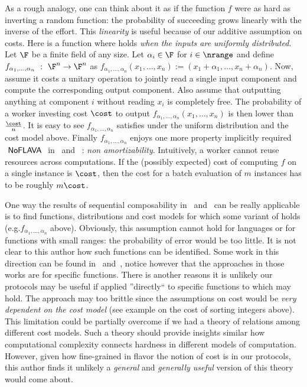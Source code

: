 {As a rough analogy, one can think about it as if the function $f$ were as hard as inverting a random function: the probability of succeeding grows linearly with the inverse of the effort.
This \emph{linearity} is useful because of our additive assumption on costs.
Here is a function where \NoFLAVA holds \textit{when the inputs are uniformly distributed}.
Let $\F$ be a finite field of any size. Let $\alpha_i \in \F$ for $i \in \nrange$ and define $f_{\alpha_1,\dots,\alpha_n}~:~\F^n \to \F^n$ as
$f_{\alpha_1,\dots,\alpha_n}(x_1,\dots,x_n) := (x_1+\alpha_1,\dots,x_n+\alpha_n)$.
Now, assume it costs a unitary operation to jointly read a single input component and compute the corresponding output component. Also assume that outputting anything at component $i$ without reading $x_i$ is completely free. The probability of a worker investing cost $\cost$ to output $f_{\alpha_1,\dots,\alpha_n}(x_1,\dots,x_n)$ is then lower than $\frac{\cost}{n}$. It is easy to see $f_{\alpha_1,\dots,\alpha_n}$ satisfies \NoFLAVA under the uniform distribution and the cost model above.
Finally $f_{\alpha_1,\dots,\alpha_n}$ enjoys one more property implicitly required $\textsf{ NoFLAVA }$ in~\cite{cg15} and ~\cite{cg17}: \textit{non amortizability}. Intuitively, a worker cannot reuse resources across computations. If the (possibly expected) cost of computing $f$ on a single instance is $\cost$, then the cost for a batch evaluation of $m$ instances has to be roughly $m \cost$.

One way the results of sequential composability in~\cite{cg15} and~\cite{cg17} can be really applicable is to find functions, distributions and cost models for which some variant of \NoFLAVA holds (e.g.$f_{\alpha_1,\dots,\alpha_n}$ above). 
Obviously, this assumption cannot hold for languages or for functions with small ranges: the probability of error would be too little.
It is not clear to this author how such functions can be identified. Some work in this direction can be found in~\cite{fghardness} 
and~\cite{fggr}, notice however that the approaches in those works are for specific functions.
There is another reasons it is unlikely our protocols may be useful if applied ''directly`` to specific functions to which \NoFLAVA may hold. 
The approach may too brittle since the assumptions on cost would be \textit{very dependent on the cost model} (see example on the cost of sorting integers above). This limitation could be partially overcome if we had a theory of relations among different cost models. Such a theory should  provide insights similar how computational complexity connects hardness in different models of computation. However, given how fine-grained in  flavor the notion of cost is in our protocols, this author finds it unlikely a \textit{general} and \textit{generally useful} version of this theory would come about.

}
